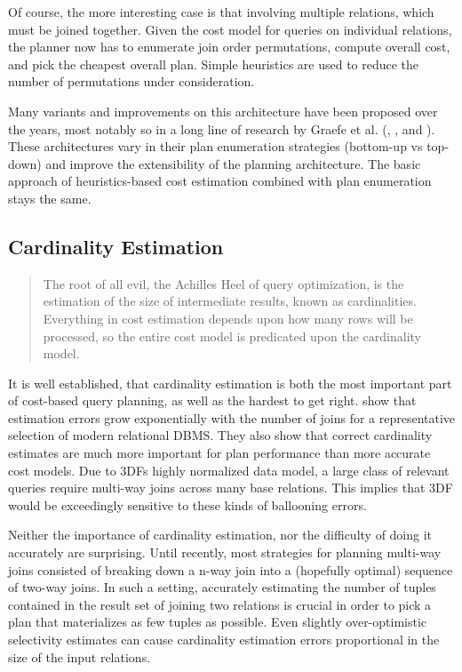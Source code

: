 \documentclass[../index.tex]{subfiles}
\begin{document}
Of course, the more interesting case is that involving multiple
relations, which must be joined together. Given the cost model for
queries on individual relations, the planner now has to enumerate join
order permutations, compute overall cost, and pick the cheapest
overall plan. Simple heuristics are used to reduce the number of
permutations under consideration.

Many variants and improvements on this architecture have been proposed
over the years, most notably so in a long line of research by Graefe
et al. (\cite{graefe1987exodus}, \cite{graefe1993volcano}, and
\cite{graefe1995cascades}). These architectures vary in their plan
enumeration strategies (bottom-up vs top-down) and improve the
extensibility of the planning architecture. The basic approach of
heuristics-based cost estimation combined with plan enumeration stays
the same.

\subsection{Cardinality Estimation}

\begin{quote}
The root of all evil, the Achilles Heel of query optimization, is the
estimation of the size of intermediate results, known as
cardinalities. Everything in cost estimation depends upon how many
rows will be processed, so the entire cost model is predicated upon
the cardinality model.

\cite{lohman2014query}
\end{quote}

It is well established, that cardinality estimation is both the most
important part of cost-based query planning, as well as the hardest to
get right. \cite{leis2015good} show that estimation errors grow
exponentially with the number of joins for a representative selection
of modern relational DBMS. They also show that correct cardinality
estimates are much more important for plan performance than more
accurate cost models. Due to 3DFs highly normalized data model, a
large class of relevant queries require multi-way joins across many
base relations. This implies that 3DF would be exceedingly sensitive
to these kinds of ballooning errors.

Neither the importance of cardinality estimation, nor the difficulty
of doing it accurately are surprising. Until recently, most strategies
for planning multi-way joins consisted of breaking down a n-way join
into a (hopefully optimal) sequence of two-way joins. In such a
setting, accurately estimating the number of tuples contained in the
result set of joining two relations is crucial in order to pick a plan
that materializes as few tuples as possible. Even slightly
over-optimistic selectivity estimates can cause cardinality estimation
errors proportional in the size of the input relations.
\end{document}
